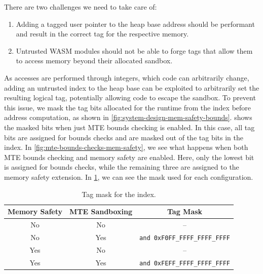 There are two challenges we need to take care of:
\begin{enumerate}
    \item Adding a tagged user pointer to the heap base address should be performant and result in the correct tag for the respective memory.
    \item Untrusted \ac{WASM} modules should not be able to forge tags that allow them to access memory beyond their allocated sandbox.
\end{enumerate}

\noindent
As accesses are performed through integers, which code can arbitrarily change, adding an untrusted index to the heap base can be exploited to arbitrarily set the resulting logical tag, potentially allowing code to escape the sandbox.
To prevent this issue, we mask the tag bits allocated for the runtime from the index before address computation, as shown in \cref{fig:system-design-mem-safety-bounds}.
 shows the masked bits when just \ac{MTE} bounds checking is enabled.
In this case, all tag bits are assigned for bounds checks and are masked out of the tag bits in the index.
In \cref{fig:mte-bounds-checks-mem-safety}, we see what happens when both \ac{MTE} bounds checking and memory safety are enabled.
Here, only the lowest bit is assigned for bounds checks, while the remaining three are assigned to the memory safety extension.
In \cref{tab:tag-mask}, we can see the mask used for each configuration.

\begin{table}
    \centering
    \caption{Tag mask for the index.}
    \label{tab:tag-mask}
    \begin{tabular}{c | c || c}
        \textbf{Memory Safety} & \textbf{MTE Sandboxing} & \textbf{Tag Mask}                     \\
        \hline
        No                     & No                      & --                                    \\
        No                     & Yes                     & \texttt{and 0xF0FF\_FFFF\_FFFF\_FFFF} \\
        Yes                    & No                      & --                                    \\
        Yes                    & Yes                     & \texttt{and 0xFEFF\_FFFF\_FFFF\_FFFF}
    \end{tabular}
\end{table}

